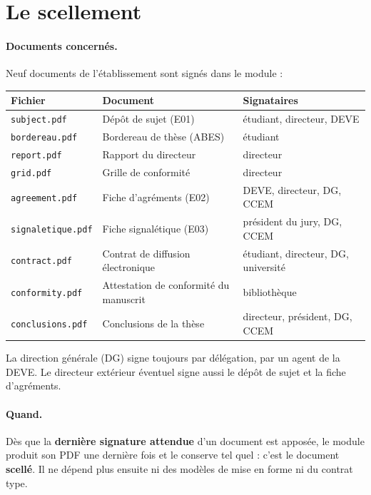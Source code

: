 \documentclass[11pt,a4paper]{article}
\begin{document}
\section{Le scellement}\label{sec:scellement}

\paragraph{Documents concernés.} Neuf documents de l'établissement sont signés dans le module :

\begin{center}
\small
\begin{tabularx}{\linewidth}{@{}l X l@{}}
\toprule
\textbf{Fichier} & \textbf{Document} & \textbf{Signataires} \\
\midrule
\texttt{subject.pdf} & Dépôt de sujet (E01) & étudiant, directeur, DEVE \\
\texttt{bordereau.pdf} & Bordereau de thèse (ABES) & étudiant \\
\texttt{report.pdf} & Rapport du directeur & directeur \\
\texttt{grid.pdf} & Grille de conformité & directeur \\
\texttt{agreement.pdf} & Fiche d'agréments (E02) & DEVE, directeur, DG, CCEM \\
\texttt{signaletique.pdf} & Fiche signalétique (E03) & président du jury, DG, CCEM \\
\texttt{contract.pdf} & Contrat de diffusion électronique & étudiant, directeur, DG, université \\
\texttt{conformity.pdf} & Attestation de conformité du manuscrit & bibliothèque \\
\texttt{conclusions.pdf} & Conclusions de la thèse & directeur, président, DG, CCEM \\
\bottomrule
\end{tabularx}
\end{center}

La direction générale (DG) signe toujours par délégation, par un agent de la DEVE. Le directeur
extérieur éventuel signe aussi le dépôt de sujet et la fiche d'agréments.

\paragraph{Quand.} Dès que la \textbf{dernière signature attendue} d'un document est apposée, le module
produit son PDF une dernière fois et le conserve tel quel : c'est le document \textbf{scellé}. Il ne
dépend plus ensuite ni des modèles de mise en forme ni du contrat type.
\end{document}
